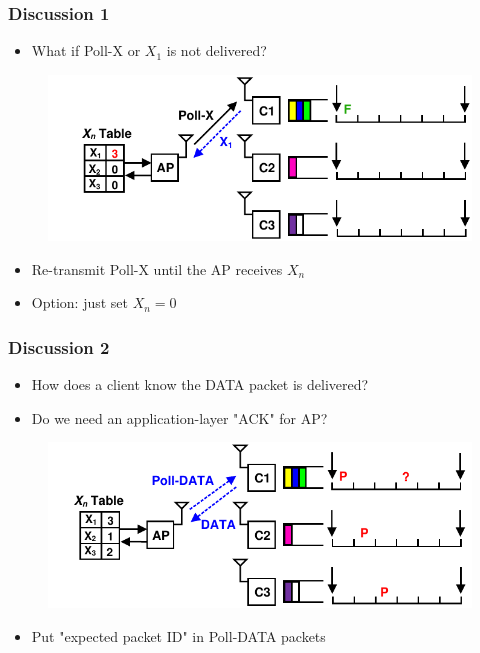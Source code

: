 \documentclass{beamer}
\begin{document}
\begin{frame}
\frametitle{Discussion 1}
\begin{itemize}
\item What if Poll-X or $X_1$ is not delivered?
\end{itemize}
\begin{figure}
\centering
\includegraphics[scale=0.8]{discussion_1.pdf}
\end{figure}
\begin{itemize}
\pause
\item Re-transmit Poll-X until the AP receives $X_n$
\item Option: just set $X_n=0$
\end{itemize}
\end{frame}


\begin{frame}
\frametitle{Discussion 2}
\begin{itemize}
\item How does a client know the DATA packet is delivered?
\item Do we need an application-layer "ACK" for AP? 
\end{itemize}
\begin{figure}
\centering
\includegraphics[scale=0.8]{discussion_2.pdf}
\end{figure}
\begin{itemize}
\pause
\item Put "expected packet ID" in Poll-DATA packets
\end{itemize}
\end{frame}
\end{document}
